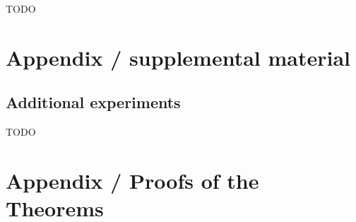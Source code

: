 \documentclass{article}
\begin{document}
TODO







\newpage
\appendix
\section{Appendix / supplemental material}\label{app:A}

\subsection{Additional experiments}\label{app:exp}

TODO


\section{Appendix / Proofs of the Theorems}\label{app:B}
\end{document}
